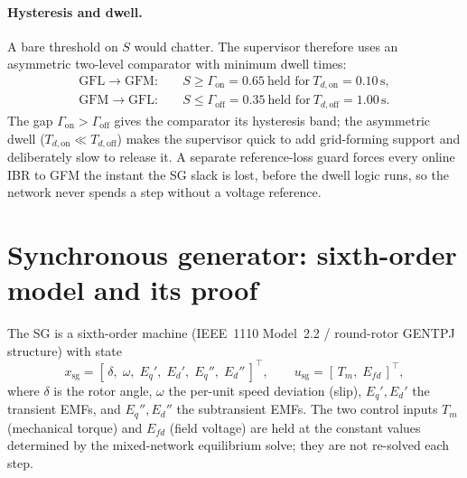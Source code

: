 \documentclass[12pt,a4paper]{article}
\newcommand{\second}{\,\mathrm{s}}
\begin{document}
\paragraph{Hysteresis and dwell.}
A bare threshold on $S$ would chatter. The supervisor therefore uses an
asymmetric two-level comparator with minimum dwell times:
\begin{equation}
  \begin{aligned}
    \text{GFL}\to\text{GFM}:&\quad S\ge\Gamma_{\mathrm{on}}=0.65
       \ \text{held for}\ T_{d,\mathrm{on}}=0.10\second,\\
    \text{GFM}\to\text{GFL}:&\quad S\le\Gamma_{\mathrm{off}}=0.35
       \ \text{held for}\ T_{d,\mathrm{off}}=1.00\second.
  \end{aligned}
  \label{eq:hyst}
\end{equation}
The gap $\Gamma_{\mathrm{on}}>\Gamma_{\mathrm{off}}$ gives the comparator its
hysteresis band; the asymmetric dwell ($T_{d,\mathrm{on}}\ll T_{d,\mathrm{off}}$)
makes the supervisor quick to add grid-forming support and deliberately slow to
release it. A separate reference-loss guard forces every online IBR to GFM the
instant the SG slack is lost, before the dwell logic runs, so the network never
spends a step without a voltage reference.

\section{Synchronous generator: sixth-order model and its proof}\label{sec:sg}
The SG is a sixth-order machine (IEEE~1110 Model~2.2 / round-rotor GENTPJ
structure) with state
\begin{equation}
  x_{\mathrm{sg}}=[\,\delta,\;\omega,\;E_q',\;E_d',\;E_q'',\;E_d''\,]^{\top},
  \qquad u_{\mathrm{sg}}=[\,T_m,\;E_{fd}\,]^{\top},
  \label{eq:sgstate}
\end{equation}
where $\delta$ is the rotor angle, $\omega$ the per-unit speed deviation (slip),
$E_q',E_d'$ the transient EMFs, and $E_q'',E_d''$ the subtransient EMFs. The two
control inputs $T_m$ (mechanical torque) and $E_{fd}$ (field voltage) are held at
the constant values determined by the mixed-network equilibrium solve; they are
not re-solved each step.
\end{document}
